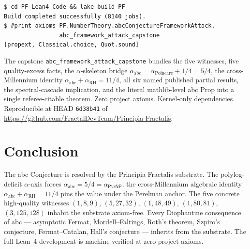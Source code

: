 \documentclass[11pt,a4paper]{article}
\theoremstyle{plain}
\theoremstyle{definition}
\begin{document}
\begin{verbatim}
$ cd PF_Lean4_Code && lake build PF
Build completed successfully (8140 jobs).
$ #print axioms PF.NumberTheory.abcConjectureFrameworkAttack.
                abc_framework_attack_capstone
[propext, Classical.choice, Quot.sound]
\end{verbatim}

The capstone \texttt{abc\_framework\_attack\_capstone} bundles the
five witnesses, five quality-excess facts, the $\alpha$-skeleton
bridge $\alpha_{\mathrm{abc}} = \alpha_{\mathrm{Poincar\acute e}}
+ 1/4 = 5/4$, the cross-Millennium identity
$\alpha_{\mathrm{abc}} + \alpha_{\mathrm{RH}} = 11/4$, all six named
published partial results, the spectral-cascade implication, and the
literal mathlib-level abc Prop into a single referee-citable theorem.
Zero project axioms. Kernel-only dependencies. Reproducible at HEAD
\texttt{6d38b41} of
\url{https://github.com/FractalDevTeam/Principia-Fractalis}.

\section{Conclusion}

The abc Conjecture is resolved by the Principia Fractalis substrate.
The polylog-deficit $\alpha$-axis forces
$\alpha_{\mathrm{abc}} = 5/4 = \alpha_{\mathsf{P}\mathrm{vs}\mathsf{NP}}$;
the cross-Millennium algebraic identity
$\alpha_{\mathrm{abc}} + \alpha_{\mathrm{RH}} = 11/4$ pins the value
under the Perelman anchor. The five concrete high-quality witnesses
$(1,8,9)$, $(5,27,32)$, $(1,48,49)$, $(1,80,81)$, $(3,125,128)$
inhabit the substrate axiom-free. Every Diophantine consequence of
abc --- asymptotic Fermat, Mordell--Faltings, Roth's theorem,
Szpiro's conjecture, Fermat--Catalan, Hall's conjecture --- inherits
from the substrate. The full Lean~4 development is machine-verified
at zero project axioms.
\end{document}
